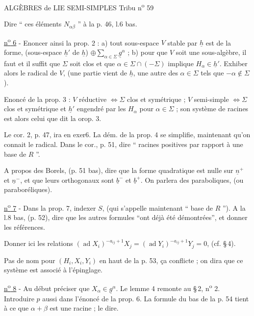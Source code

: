ALGÈBRES de LIE SEMI-SIMPLES \hfill Tribu n\textsuperscript{o} 59

Dire `` ces éléments $N_{\alpha\beta}$ '' à la p. 46, l.6 bas.

\uline{n\textsuperscript{o} 6} - Enoncer ainsi la prop. 2 : a) tout sous-espace $V$ stable par $\underline{h}$ est de la forme, (sous-espace $\underline{h}'$ de $\underline{h}$) $\oplus\sum_{\alpha\in\Sigma}\underline{g}^{\alpha}$ ; b) pour que $V$ soit une sous-algèbre, il faut et il suffit que $\Sigma$ soit clos et que $\alpha\in\Sigma\cap(-\Sigma)$ implique $H_\alpha\in\underline{h}'$. Exhiber alors le radical de $V$, (une partie vient de $\underline{h}$, une autre des $\alpha\in\Sigma$ tels que $-\alpha\notin\Sigma$).

Enoncé de la prop. 3 : $V$ réductive $\Longleftrightarrow\Sigma$ clos et symétrique ; $V$ semi-simple $\Longleftrightarrow\Sigma$ clos et symétrique et $\underline{h}'$ engendré par les $H_\alpha$ pour $\alpha\in\Sigma$ ; son système de racines est alors celui que dit la orop. 3.

Le cor. 2, p. 47, ira en exer6. La dém. de la prop. 4 se simplifie, maintenant qu'on connait le radical. Dans le cor., p. 51, dire `` racines positives par rapport à une base de $R$ ''.

A propos des Borels, (p. 51 bas), dire que la forme quadratique est nulle sur $\underline{n}^{+}$ et $\underline{n}^{-}$, et que leurs orthogonaux sont $\underline{b}^{-}$ et $\underline{b}^{+}$. On parlera des paraboliques, (ou paraboréliques).

\uline{n\textsuperscript{o} 7} - Dans la prop. 7, indexer $S$, (qui s'appelle maintenant `` base de $R$ ''). A la l.8 bas, (p. 52), dire que les autres formules ``ont déjà été démontrées'', et donner les références.

Donner ici les relations $(\operatorname{ad}X_i)^{-a_{ij}+1}X_j=(\operatorname{ad}Y_i)^{-a_{ij}+1}Y_j=0$, (cf. \S\,4).

Pas de nom pour $(H_i,X_i,Y_i)$ en haut de la p. 53, ça conflicte ; on dira que ce système est associé à l'épinglage.

\uline{n\textsuperscript{o} 8} - Au début préciser que $X_\alpha\in\underline{g}^{\alpha}$. Le lemme 4 remonte au \S\,2, n\textsuperscript{o} 2. Introduire $p$ aussi dans l'énoncé de la prop. 6. La formule du bas de la p. 54 tient à ce que $\alpha+\beta$ est une racine ; le dire.


